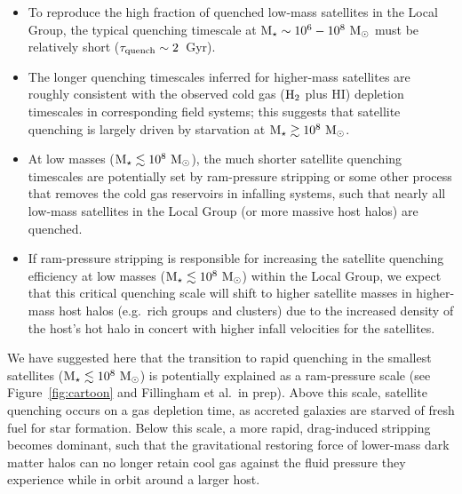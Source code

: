 \documentclass[usenatbib]{mn2e}
\newcommand{\mstar}{{\rm M}_{\star}}
\newcommand{\msun}{{\rm M}_{\odot}}
\begin{document}
\begin{itemize}[leftmargin=0.25cm]

\item To reproduce the high fraction of quenched low-mass satellites
  in the Local Group, the typical quenching timescale at $\mstar \sim
  10^{6}-10^{8}~\msun$ must be relatively short ($\tau_{\rm
    quench} \sim 2$~Gyr).  \\

\item The longer quenching timescales inferred for higher-mass
  satellites are roughly consistent with the observed cold gas (${\rm
    H}_{2}$ plus H{\scriptsize I}) depletion timescales in
  corresponding field systems; this suggests that satellite quenching
  is largely driven by starvation at $\mstar \gtrsim 10^{8}~\msun$.  \\

\item At low masses ($\mstar \lesssim 10^{8}~\msun$), the much shorter
  satellite quenching timescales are potentially set by ram-pressure
  stripping or some other process that removes the cold gas reservoirs
  in infalling systems, such that nearly all low-mass satellites in
  the Local Group (or more massive host halos) are quenched.

\item If ram-pressure stripping is responsible for increasing the
  satellite quenching efficiency at low masses ($\mstar \lesssim
  10^{8}~\msun$) within the Local Group, we expect that this critical
  quenching scale will shift to higher satellite masses in higher-mass
  host halos (e.g.~rich groups and clusters) due to the increased
  density of the host's hot halo in concert with higher infall
  velocities for the satellites.

\end{itemize}

We have suggested here that the transition to rapid quenching in the
smallest satellites ($\mstar \lesssim 10^{8}~\msun$) is potentially
explained as a ram-pressure scale (see Figure~\ref{fig:cartoon} and
Fillingham et al.~in prep). Above this scale, satellite quenching
occurs on a gas depletion time, as accreted galaxies are starved of
fresh fuel for star formation.  Below this scale, a more rapid,
drag-induced stripping becomes dominant, such that the gravitational
restoring force of lower-mass dark matter halos can no longer retain
cool gas against the fluid pressure they experience while in orbit
around a larger host.
 
\end{document}
